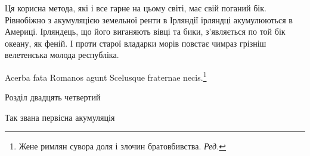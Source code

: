 Ця корисна метода, які і все гарне на цьому світі, має свій
поганий бік. Рівнобіжно з акумуляцією земельної ренти в Ірляндії
ірляндці акумулюються в Америці. Ірляндець, що його виганяють
вівці та бики, з’являється по той бік океану, як феній.
І проти старої владарки морів повстає чимраз грізніш велетенська
молода республіка.

                                      Acerba fata Romanos agunt
                                       Scelusque fraternae necis.\footnote*{
Жене римлян сувора доля і злочин братовбивства. \emph{Ред.}
}

Розділ двадцять четвертий

Так звана первісна акумуляція
\parbreak{}  %
